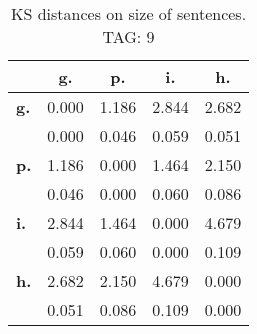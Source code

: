 \begin{table}[h!]
\begin{center}
\begin{tabular}{| l || c | c | c | c |}\hline
 & {\bf g.} & {\bf p.} & {\bf i.} & {\bf h.} \\\hline\hline
{\bf g.} & 0.000 & 1.186 & 2.844 & 2.682 \\
{\bf } & 0.000 & 0.046 & 0.059 & 0.051 \\\hline
{\bf p.} & 1.186 & 0.000 & 1.464 & 2.150 \\
{\bf } & 0.046 & 0.000 & 0.060 & 0.086 \\\hline
{\bf i.} & 2.844 & 1.464 & 0.000 & 4.679 \\
{\bf } & 0.059 & 0.060 & 0.000 & 0.109 \\\hline
{\bf h.} & 2.682 & 2.150 & 4.679 & 0.000 \\
{\bf } & 0.051 & 0.086 & 0.109 & 0.000 \\\hline
\end{tabular}
\caption{KS distances on size of sentences. TAG: 9}
\end{center}
\end{table}
